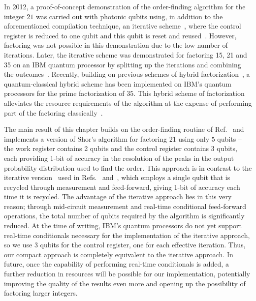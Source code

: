 \clearpage
\noindent
In 2012, a proof-of-concept demonstration of the order-finding algorithm for the integer $21$ was carried out with photonic qubits using, in addition to the aforementioned compilation technique, an iterative scheme~\cite{Lopez_2012}, where the control register is reduced to one qubit and this qubit is reset and reused~\cite{Griffiths_1996}. However, factoring was not possible in this demonstration due to the low number of iterations. Later, the iterative scheme was demonstrated for factoring 15, 21 and 35 on an IBM quantum processor by splitting up the iterations and combining the outcomes~\cite{Amico_2019}. Recently, building on previous schemes of hybrid factorization~\cite{Pal_2019, Xu_2012}, a quantum-classical hybrid scheme has been implemented on IBM's quantum processors for the prime factorization of $35$. This hybrid scheme of factorization alleviates the resource requirements of the algorithm at the expense of performing part of the factoring classically~\cite{Saxena_2021}.

\bigskip
\noindent
The main result of this chapter builds on the order-finding routine of Ref.~\cite{Lopez_2012} and implements a version of Shor's algorithm for factoring 21 using only $5$ qubits -- the work register contains 2 qubits and the control register contains $3$ qubits, each providing 1-bit of accuracy in the resolution of the peaks in the output probability distribution used to find the order. This approach is in contrast to the iterative version~\cite{Parker_2000} used in Refs.~\cite{Lopez_2012} and~\cite{Amico_2019}, which employs a single qubit that is recycled through measurement and feed-forward, giving 1-bit of accuracy each time it is recycled. The advantage of the iterative approach lies in this very reason; through mid-circuit measurement and real-time conditional feed-forward operations, the total number of qubits required by the algorithm is significantly reduced. At the time of writing, IBM's quantum processors do not yet support real-time conditionals necessary for the implementation of the iterative approach, so we use 3 qubits for the control register, one for each effective iteration. Thus, our compact approach is completely equivalent to the iterative approach. In future, once the capability of performing real-time conditionals is added, a further reduction in resources will be possible for our implementation, potentially improving the quality of the results even more and opening up the possibility of factoring larger integers.

